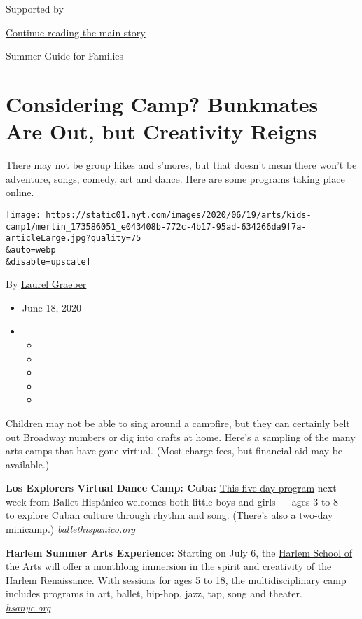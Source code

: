 Supported by

\protect\hyperlink{after-sponsor}{Continue reading the main story}

Summer Guide for Families

\hypertarget{considering-camp-bunkmates-are-out-but-creativity-reigns}{%
\section{Considering Camp? Bunkmates Are Out, but Creativity
Reigns}\label{considering-camp-bunkmates-are-out-but-creativity-reigns}}

There may not be group hikes and s'mores, but that doesn't mean there
won't be adventure, songs, comedy, art and dance. Here are some programs
taking place online.

\texttt{[image: https://static01.nyt.com/images/2020/06/19/arts/kids-camp1/merlin\_173586051\_e043408b-772c-4b17-95ad-634266da9f7a-articleLarge.jpg?quality=75\\\&auto=webp\\\&disable=upscale]}

By \href{https://www.nytimes.com/by/laurel-graeber}{Laurel Graeber}

\begin{itemize}
\item
  June 18, 2020
\item
  \begin{itemize}
  \item
  \item
  \item
  \item
  \item
  \end{itemize}
\end{itemize}

Children may not be able to sing around a campfire, but they can
certainly belt out Broadway numbers or dig into crafts at home. Here's a
sampling of the many arts camps that have gone virtual. (Most charge
fees, but financial aid may be available.)

\textbf{Los Explorers Virtual Dance Camp: Cuba:}
\href{https://www.ballethispanico.org/school/b-learning-online/virtual-los-explorers}{This
five-day program} next week from Ballet Hispánico welcomes both little
boys and girls --- ages 3 to 8 --- to explore Cuban culture through
rhythm and song. (There's also a two-day minicamp.)
\href{https://www.ballethispanico.org/}{\emph{ballethispanico.org}}

\textbf{Harlem Summer Arts Experience:} Starting on July 6, the
\href{https://hsa.asapconnected.com/?org=4795\#ProgramID=5948}{Harlem
School of the Arts} will offer a monthlong immersion in the spirit and
creativity of the Harlem Renaissance. With sessions for ages 5 to 18,
the multidisciplinary camp includes programs in art, ballet, hip-hop,
jazz, tap, song and theater.\\
\href{https://hsanyc.org/}{\emph{hsanyc.org}}

